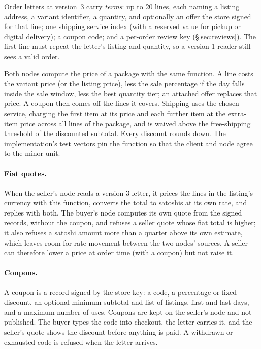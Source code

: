 Order letters at version~3 carry \emph{terms}: up to 20 lines, each naming a listing address, a variant identifier, a quantity, and optionally an offer the store signed for that line; one shipping service index (with a reserved value for pickup or digital delivery); a coupon code; and a per-order review key (\S\ref{sec:reviews}). The first line must repeat the letter's listing and quantity, so a version-1 reader still sees a valid order.

Both nodes compute the price of a package with the same function. A line costs the variant price (or the listing price), less the sale percentage if the day falls inside the sale window, less the best quantity tier; an attached offer replaces that price. A coupon then comes off the lines it covers. Shipping uses the chosen service, charging the first item at its price and each further item at the extra-item price across all lines of the package, and is waived above the free-shipping threshold of the discounted subtotal. Every discount rounds down. The implementation's test vectors pin the function so that the client and node agree to the minor unit.

\paragraph{Fiat quotes.} When the seller's node reads a version-3 letter, it prices the lines in the listing's currency with this function, converts the total to satoshis at its own rate, and replies with both. The buyer's node computes its own quote from the signed records, without the coupon, and refuses a seller quote whose fiat total is higher; it also refuses a satoshi amount more than a quarter above its own estimate, which leaves room for rate movement between the two nodes' sources. A seller can therefore lower a price at order time (with a coupon) but not raise it.

\paragraph{Coupons.} A coupon is a record signed by the store key: a code, a percentage or fixed discount, an optional minimum subtotal and list of listings, first and last days, and a maximum number of uses. Coupons are kept on the seller's node and not published. The buyer types the code into checkout, the letter carries it, and the seller's quote shows the discount before anything is paid. A withdrawn or exhausted code is refused when the letter arrives.

